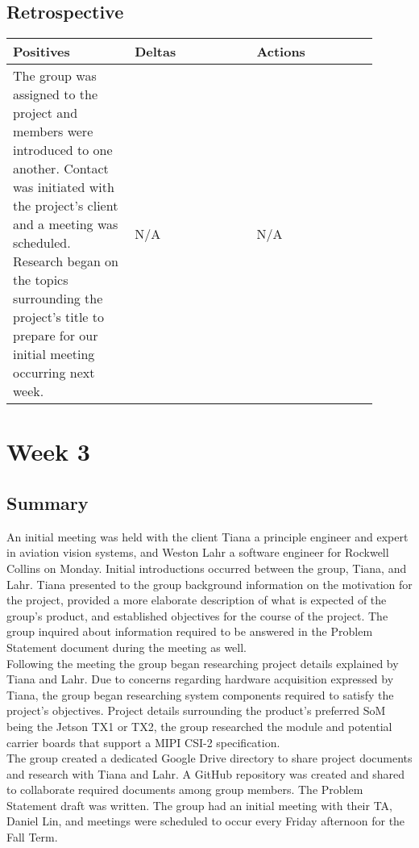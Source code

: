 \documentclass[letterpaper,10pt,serif,draftclsnofoot,onecolumn,compsoc,titlepage]{IEEEtran}
\begin{document}
\subsection{Retrospective}

\begin{tabular}{|p{0.3\linewidth}|p{0.3\linewidth}|p{0.3\linewidth}|}
   \hline
   \textbf{Positives} & \textbf{Deltas} & \textbf{Actions}\\ 
   \hline
   The group was assigned to the project and members were introduced to one another. 
   Contact was initiated with the project's client and a meeting was scheduled. 
   Research began on the topics surrounding the project's title to prepare 
   for our initial meeting occurring next week. 
   & 
   N/A 
   & 
   N/A \\
   \hline
\end{tabular}


\section{Week 3}

\subsection{Summary}

An initial meeting was held with the client Tiana a principle engineer and expert 
in aviation vision systems, and Weston Lahr a software engineer 
for Rockwell Collins on Monday. Initial introductions occurred between the group, 
Tiana, and Lahr. 
Tiana presented to the group background information on the motivation for the project, 
provided a more elaborate description of what is expected of the group's product, and 
established objectives for the course of the project. The group inquired about 
information required to be answered in the Problem Statement document during the meeting 
as well. \\

Following the meeting the group began researching project details explained by Tiana 
and Lahr. Due to concerns regarding hardware acquisition expressed by Tiana, the group 
began researching system components required to satisfy the project's objectives. 
Project details surrounding the product's preferred SoM being the Jetson TX1 or TX2, 
the group researched the module and potential carrier boards that support a MIPI 
CSI-2 specification. \\

The group created a dedicated Google Drive directory to share project documents and 
research with Tiana and Lahr. A GitHub repository was created and shared to 
collaborate required documents among group members. The Problem Statement draft was 
written. The group had an initial meeting with their TA, Daniel Lin, and meetings 
were scheduled to occur every Friday afternoon for the Fall Term.\\
\end{document}
